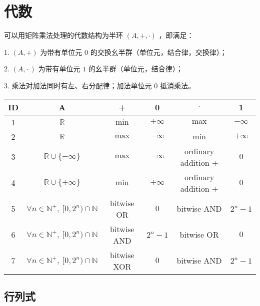 \section{代数}


可以用矩阵乘法处理的代数结构为半环 $(A,+,\cdot)$ ，即满足：

1. $(A,+)$ 为带有单位元 $0$ 的交换幺半群（单位元，结合律，交换律）；

2. $(A,\cdot\ )$ 为带有单位元 $1$ 的幺半群（单位元，结合律）；

3. 乘法对加法同时有左、右分配律；加法单位元 $0$ 抵消乘法。


\begin{table}[htbp]
\begin{tabular}{cccccc}
ID          & A                                                    & +             & 0            & $\cdot$               & 1  \\ \hline
1           & $\mathbb{R}                                        $ & $\min       $ & $+\infty   $ & $\max               $ & $-\infty$    \\ 
2           & $\mathbb{R}                                        $ & $\max       $ & $-\infty   $ & $\min               $ & $+\infty$    \\
3           & $\mathbb{R}\cup \{-\infty \}                       $ & $\max       $ & $-\infty   $ & ordinary addition $+$ & $0$          \\ 
4           & $\mathbb{R}\cup \{+\infty \}                       $ & $\min       $ & $+\infty   $ & ordinary addition $+$ & $0$          \\
5           & $\forall n\in \mathbb{N^+},\ [0,2^n)\cap \mathbb{N}$ & bitwise OR    & $0         $ & bitwise AND           & $2^n-1$      \\ 
6           & $\forall n\in \mathbb{N^+},\ [0,2^n)\cap \mathbb{N}$ & bitwise AND   & $2^n-1     $ & bitwise OR            & $0$          \\
7           & $\forall n\in \mathbb{N^+},\ [0,2^n)\cap \mathbb{N}$ & bitwise XOR   & $0         $ & bitwise AND           & $2^n-1$     
\end{tabular}
\end{table}

\vspace{-0.3cm}



\newpage

\subsection{行列式}

